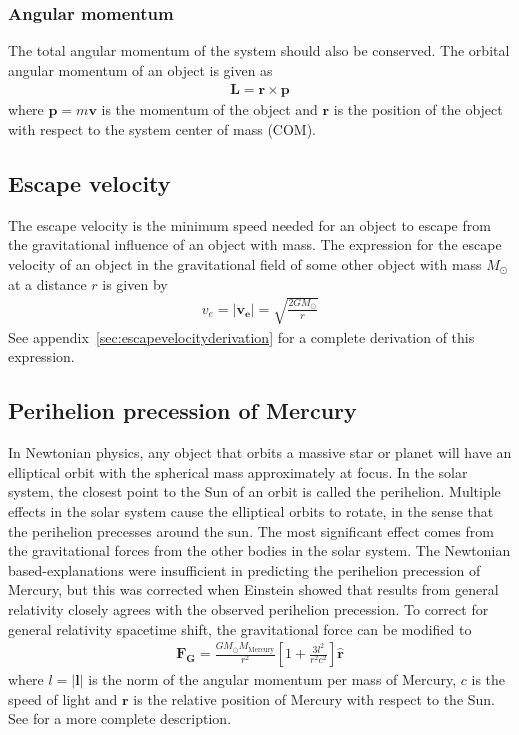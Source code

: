 \documentclass[aps,reprint]{revtex4-1}
\begin{document}
\subsubsection{Angular momentum}
The total angular momentum of the system should also be conserved. The orbital
angular momentum of an object is given as
\begin{align}
  \mathbf{L} = \mathbf{r} \times \mathbf{p}
\end{align}
where $\mathbf{p} = m \mathbf{v}$ is the momentum of the object and $\mathbf{r}$
is the position of the object with respect to the system center of mass (COM).
\subsection{Escape velocity}
The escape velocity is the minimum speed needed for an object to escape from the
gravitational influence of an object with mass. The expression for the escape
velocity of an object in the gravitational field of some other object with mass
$M_\odot$ at a distance $r$ is given by
\begin{align}
  \label{eq:escapevelocity}
  v_e = |\mathbf{v_e}| = \sqrt{\frac{2GM_\odot}{r}}
\end{align}
See appendix~\ref{sec:escapevelocityderivation} for a complete derivation of this expression.

\subsection{Perihelion precession of Mercury}
In Newtonian physics, any object that orbits a massive star or planet will have an elliptical orbit with
the spherical mass approximately at focus. In the solar system, the closest point to the Sun of an orbit is called
the perihelion. Multiple effects in the solar system cause the elliptical orbits
to rotate, in the sense that the perihelion
precesses around the sun. The most significant effect comes from the gravitational forces from the other bodies in
the solar system. The Newtonian based-explanations were insufficient in
predicting the perihelion precession of Mercury, but
this was corrected when Einstein showed that results from general relativity closely agrees with the observed
perihelion precession. To correct for general relativity spacetime shift, the gravitational force can be modified to
\begin{align}
\label{eq:mercuryprecession}
\mathbf{F_G} = \frac{G M_\odot M_\text{Mercury}}{r^2}\left[1 + \frac{3l^2}{r^2c^2} \right] \hat{\mathbf{r}}
\end{align}
where $l = |\mathbf{l}|$ is the norm of the angular momentum per mass of Mercury, $c$ is the speed of light and
$\mathbf{r}$ is the relative position of Mercury with respect to the Sun. See \cite{project3}
for a more complete description.
\end{document}
